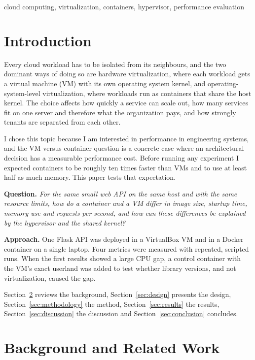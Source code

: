\documentclass[conference,a4paper]{IEEEtran}
\begin{document}
\begin{IEEEkeywords}
cloud computing, virtualization, containers, hypervisor, performance evaluation
\end{IEEEkeywords}

\section{Introduction}
\label{sec:introduction}

Every cloud workload has to be isolated from its neighbours, and the two dominant ways of doing so are hardware virtualization, where each workload gets a virtual machine (VM) with its own operating system kernel, and operating-system-level virtualization, where workloads run as containers that share the host kernel. The choice affects how quickly a service can scale out, how many services fit on one server and therefore what the organization pays, and how strongly tenants are separated from each other.

I chose this topic because I am interested in performance in engineering systems, and the VM versus container question is a concrete case where an architectural decision has a measurable performance cost. Before running any experiment I expected containers to be roughly ten times faster than VMs and to use at least half as much memory. This paper tests that expectation.

\textbf{Question.} \emph{For the same small web API on the same host and with the same resource limits, how do a container and a VM differ in image size, startup time, memory use and requests per second, and how can these differences be explained by the hypervisor and the shared kernel?}

\textbf{Approach.} One Flask API was deployed in a VirtualBox VM and in a Docker container on a single laptop. Four metrics were measured with repeated, scripted runs. When the first results showed a large CPU gap, a control container with the VM's exact userland was added to test whether library versions, and not virtualization, caused the gap.

Section~\ref{sec:related_work} reviews the background, Section~\ref{sec:design} presents the design, Section~\ref{sec:methodology} the method, Section~\ref{sec:results} the results, Section~\ref{sec:discussion} the discussion and Section~\ref{sec:conclusion} concludes.

\section{Background and Related Work}
\label{sec:related_work}
\end{document}
